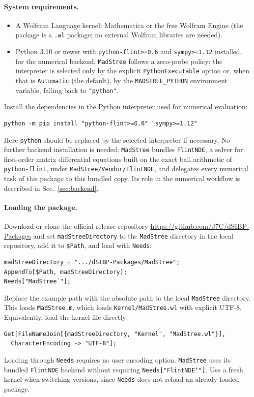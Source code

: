 \documentclass[11pt,a4paper]{article}
\numberwithin{table}{section}
\begin{document}
\paragraph{System requirements.}
\begin{itemize}
  \item A Wolfram Language kernel: Mathematica or the free Wolfram Engine (the package is a
        \texttt{.wl} package; no external Wolfram libraries are needed).
  \item Python 3.10 or newer with \texttt{python-flint>=0.6} and \texttt{sympy>=1.12} installed, for the numerical backend.
        \texttt{MadStree} follows a zero-probe policy: the interpreter is selected only by the explicit
        \texttt{PythonExecutable} option or, when that is \texttt{Automatic} (the default), by the
        \texttt{MADSTREE\_PYTHON} environment variable, falling back to \texttt{"python"}.
\end{itemize}
Install the dependencies in the Python interpreter used for numerical evaluation:
\begin{verbatim}
python -m pip install "python-flint>=0.6" "sympy>=1.12"
\end{verbatim}
Here \texttt{python} should be replaced by the selected interpreter if necessary.
No further backend installation is needed: \texttt{MadStree} bundles \texttt{FlintNDE}, a solver for first-order
matrix differential equations built on the exact ball arithmetic of \texttt{python-flint}, under
\texttt{MadStree/Vendor/FlintNDE}, and delegates every numerical task of this package to this
bundled copy. Its role in the numerical workflow is described in Sec.~\ref{sec:backend}.

\paragraph{Loading the package.}

Download or clone the official release repository
\url{https://github.com/J7C/dSIBP-Packages} and
set \texttt{madStreeDirectory} to the \texttt{MadStree} directory in the local repository,
add it to \texttt{\$Path}, and load with \texttt{Needs}:
\begin{verbatim}
madStreeDirectory = ".../dSIBP-Packages/MadStree";
AppendTo[$Path, madStreeDirectory];
Needs["MadStree`"];
\end{verbatim}
Replace the example path with the absolute path to the local \texttt{MadStree} directory.
This loads \texttt{MadStree.m}, which loads \texttt{Kernel/MadStree.wl} with explicit UTF-8.
Equivalently, load the kernel file directly:
\begin{verbatim}
Get[FileNameJoin[{madStreeDirectory, "Kernel", "MadStree.wl"}],
  CharacterEncoding -> "UTF-8"];
\end{verbatim}
Loading through \texttt{Needs} requires no user encoding option.
\texttt{MadStree} uses its bundled \texttt{FlintNDE} backend without requiring \texttt{Needs["FlintNDE`"]}.
Use a fresh kernel when switching versions, since \texttt{Needs} does not reload
an already loaded package.
\end{document}
